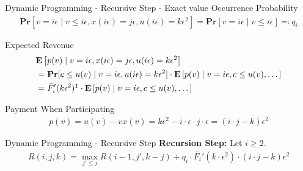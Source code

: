 \documentclass{beamer}
\begin{document}
\begin{frame}{Dynamic Programming - Recursive Step - Exact value}
  Occurrence Probability
  \begin{align*}
    \mathbf{Pr}[v = i\epsilon \mid v \leq i \epsilon, x(i\epsilon) = j\epsilon, u(i\epsilon) = k\epsilon^2] = \mathbf{Pr}[v = i\epsilon \mid v \leq i \epsilon] \eqcolon q_i
  \end{align*}

  Expected Revenue
  \begin{align*}
     & \mathbf{E}\left[p(v) \mid v = i\epsilon, x(i\epsilon) = j\epsilon, u(i\epsilon) = k\epsilon^2 \right]                                               \\
     & = \mathbf{Pr}[c \leq u(v) \mid v = i\epsilon, u(i\epsilon) = k\epsilon^2] \cdot \mathbf{E}\left[p(v) \mid v = i\epsilon, c \leq u(v), \dots \right] \\
     & = \bar{F}'_i(k \epsilon^2) \footnotemark[1] \cdot \mathbf{E}\left[p(v) \mid v = i\epsilon, c \leq u(v), \dots \right]
  \end{align*}

  Payment When Participating
  \begin{align*}
    p(v) = u(v) - v x(v) = k\epsilon^2 - i \cdot \epsilon \cdot j \cdot \epsilon = (i \cdot j - k) \epsilon^2
  \end{align*}

\end{frame}

\begin{frame}{Dynamic Programming - Recursive Step}
  \textbf{Recursion Step:}
  Let $i \geq 2$.
  \begin{align*}
    R(i,j,k) = \max_{j' \leq j} R(i-1, j', k-j) + q_i \cdot \bar{F_i}'(k \cdot \epsilon^2) \cdot (i\cdot j - k) \epsilon^2
  \end{align*}
\end{frame}
\end{document}
